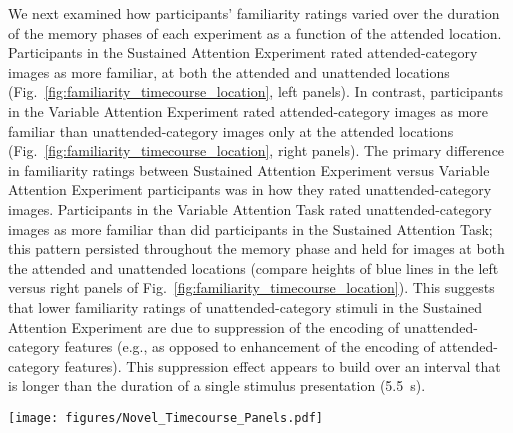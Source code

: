 \documentclass[english]{article}
\newcommand{\timecourseNovel}{S7}
\newcommand{\timecourseDiff}{S8}
\begin{document}
We next examined how participants' familiarity ratings varied over the duration of the memory phases of each experiment as a function of the attended location.  Participants in the Sustained Attention Experiment rated attended-category images as more familiar, at both the attended and unattended locations (Fig.~\ref{fig:familiarity_timecourse_location}, left panels).  In contrast, participants in the Variable Attention Experiment rated attended-category images as more familiar than unattended-category images only at the attended locations (Fig.~\ref{fig:familiarity_timecourse_location}, right panels).  The primary difference in familiarity ratings between Sustained Attention Experiment versus Variable Attention Experiment participants was in how they rated unattended-category images.  Participants in the Variable Attention Task rated unattended-category images as more familiar than did participants in the Sustained Attention Task; this pattern persisted throughout the memory phase and held for images at both the attended and unattended locations (compare heights of blue lines in the left versus right panels of Fig.~\ref{fig:familiarity_timecourse_location}).  This suggests that lower familiarity ratings of unattended-category stimuli in the Sustained Attention Experiment are due to suppression of the encoding of unattended-category features (e.g., as opposed to enhancement of the encoding of attended-category features).  This suppression effect appears to build over an interval that is longer than the duration of a single stimulus presentation (5.5~s).

\begin{figure*}[tp]
  \centering
  \texttt{[image: figures/Novel\_Timecourse\_Panels.pdf]}
  \caption{\textbf{Familiarity ratings over time for attended-category and unattended-category novel images.}  The top panels of this figure follow the same formats and conventions as Figures~\ref{fig:familiarity_timecourse_category} and \ref{fig:familiarity_timecourse_location}.  The bottom panels display the differences between the timecourses of familiarity ratings of attended-category and unattended-category novel stimuli.  The error ribbons denote 95\% confidence intervals, computed across participants.  The dotted horizontal line in each panel denotes a difference of 0-- i.e., the value above which attended-category novel images were rated as more familiar than unattended-category novel images.  The black lines in the bottom panels display linear regression fits to the data (error ribbons denote 95\% confidence intervals).   Figures~\timecourseNovel~and \timecourseDiff~display these results broken down by participant cohort.}
\label{fig:familiarity_timecourse_novel}
\end{figure*}
\end{document}
